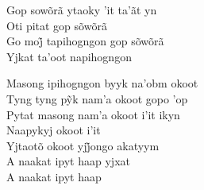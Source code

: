\bigskip

\begin{linenumbers}\begingroup\raggedright
 
\noindent   Gop sowõrã ytaoky 'it ta'ãt yn\\
  Oti pitat gop sõwõrã\\
  Go moj̃ tapihogngon gop sõwõrã\\
  Yjkat ta'oot napihogngon
 
\end{linenumbers}\endgroup

\bigskip

\begin{linenumbers}\begingroup\raggedright
 
\noindent   Masong ipihogngon byyk na'obm okoot\\
  Tyng tyng pỹk nam’a okoot gopo ’op\\
  Pytat masong nam'a okoot i'it ikyn\\
  Naapykyj okoot i'it\\
  Yjtaotõ okoot yjj̃ongo akatyym\\
  A naakat ipyt haap yjxat\\
  A naakat ipyt haap
 
\end{linenumbers}\endgroup

\bigskip

